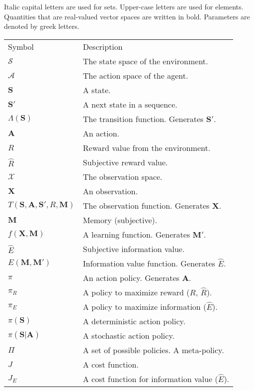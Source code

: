 Italic capital letters are used for sets. Upper-case letters are used for elements. Quantities that are real-valued vector spaces are written in bold. Parameters are denoted by greek letters.

\begin{table}[]
    \begin{tabular}{ll}
    Symbol & Description \\
    $\mathcal{S}$ & The state space of the environment. \\
    $\mathcal{A}$ & The action space of the agent. \\
    $\mathbf{S}$ & A state. \\
    $\mathbf{S'}$ & A next state in a sequence. \\
    $\Lambda(\mathbf{S})$ & The transition function. Generates $\mathbf{S'}$. \\
    $\mathbf{A}$ & An action. \\
    $R$ & Reward value from the environment. \\
    $\hat R$ & Subjective reward value. \\
    $\mathcal{X}$ & The observation space. \\
    $\mathbf{X}$ & An observation. \\
    $T(\mathbf{S},\mathbf{A},\mathbf{S'},R,\mathbf{M})$ & The observation function. Generates $\mathbf{X}$. \\
    $\mathbf{M}$ & Memory (subjective). \\
    $f(\mathbf{\mathbf{X},M})$ & A learning function. Generates $\mathbf{M'}$. \\
    $\hat E$ & Subjective information value. \\
    $E(\mathbf{M},\mathbf{M'})$ & Information value function. Generates $\hat E$. \\
    $\pi$ & An action policy. Generates $\mathbf{A}$. \\
    $\pi_R$ & A policy to maximize reward ($R$, $\hat R$). \\
    $\pi_E$ & A policy to maximize information ($\hat E$). \\
    $\pi(\mathbf{S})$ & A deterministic action policy. \\
    $\pi(\mathbf{S}|\mathbf{A})$ & A stochastic action policy. \\
    $\Pi$ & A set of possible policies. A meta-policy. \\
    $J$ & A cost function. \\
    $J_E$ & A cost function for information value ($\hat E$). \\

\end{tabular}
\end{table}
